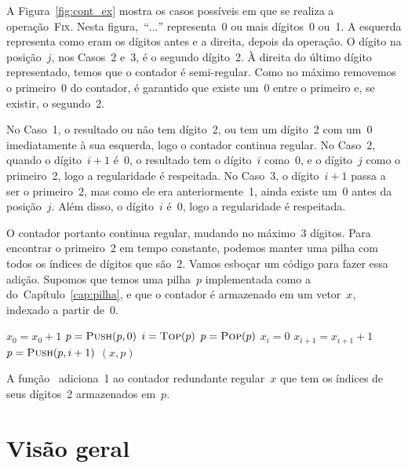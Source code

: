 \documentclass[../../main.tex]{subfiles}
\begin{document}
A Figura~\ref{fig:cont_ex} mostra os casos possíveis em que se realiza a operação~\textsc{Fix}. Nesta figura,~``$\ldots$'' representa~0 ou mais dígitos~0 ou~1. A esquerda representa como eram os dígitos antes e a direita, depois da operação. O dígito na posição~$j$, nos Casos~2 e~3, é o segundo dígito~2. À direita do último dígito representado, temos que o contador é semi-regular. Como no máximo removemos o primeiro~0 do contador, é garantido que existe um~0 entre o primeiro e, se existir, o segundo~2.

No Caso~1, o resultado ou não tem dígito~2, ou tem um dígito~2 com um~0 imediatamente à sua esquerda, logo o contador continua regular. No Caso~2, quando o dígito~$i + 1$ é~0, o resultado tem o dígito~$i$ como~0, e o dígito~$j$ como o primeiro~2, logo a regularidade é respeitada. No Caso~3, o dígito~$i+1$ passa a ser o primeiro~2, mas como ele era anteriormente~1, ainda existe um~0 antes da posição~$j$. Além disso, o dígito~$i$ é~0, logo a regularidade é respeitada.

O contador portanto continua regular, mudando no máximo~3 dígitos. Para encontrar o primeiro~2 em tempo constante, podemos manter uma pilha com todos os índices de dígitos que são~2. Vamos esboçar um código para fazer essa adição. Supomos que temos uma pilha~$p$ implementada como a do~Capítulo~\ref{cap:pilha}, e que o contador é armazenado em um vetor~$x$, indexado a partir de~0.

\begin{algorithm}
\begin{algorithmic}[1]

    \State $x_0 = x_0 + 1$
        \State $p = \Call{Push}{p, 0}$
    \EndIf
     
        \State $i = \Call{Top}{p}$
        \State $p = \Call{Pop}{p}$
        \State $x_i = 0$
        \State $x_{i+1} = x_{i+1} + 1$
            \State $p = \Call{Push}{p, i + 1}$
        \EndIf
    \EndIf
    \State \Return $(x, p)$
\EndFunction

\end{algorithmic}
\end{algorithm}

A função~ adiciona~1 ao contador redundante regular~$x$ que tem os índices de seus dígitos~2 armazenados em~$p$.

\section{Visão geral}
\end{document}
